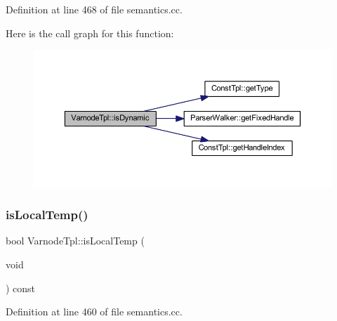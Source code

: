 Definition at line 468 of file semantics.\+cc.

Here is the call graph for this function\+:
\nopagebreak
\begin{figure}[H]
\begin{center}
\leavevmode
\includegraphics[width=350pt]{class_varnode_tpl_a2a8ab3751ee12b01f405e377911b3098_cgraph}
\end{center}
\end{figure}
\mbox{\label{class_varnode_tpl_a8f21f8da0ea1eae3995b90787849b592}} 
\subsubsection{\texorpdfstring{isLocalTemp()}{isLocalTemp()}}
{\footnotesize\ttfamily bool Varnode\+Tpl\+::is\+Local\+Temp (\begin{DoxyParamCaption}\item[{void}]{ }\end{DoxyParamCaption}) const}



Definition at line 460 of file semantics.\+cc.

